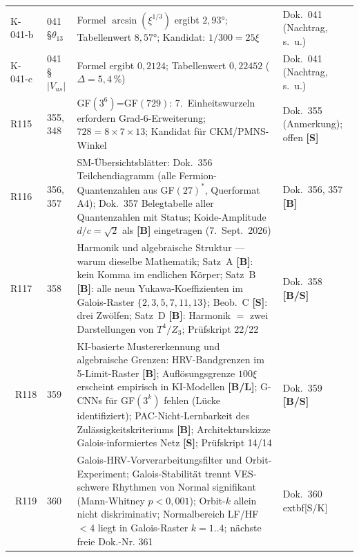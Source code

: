 \begin{longtable}{@{}p{1.2cm}p{3.4cm}p{5.8cm}p{3.4cm}@{}}
K-041-b & 041 \S$\theta_{13}$ & Formel $\arcsin(\xi^{1/3})$ ergibt $2{,}93°$; Tabellenwert $8{,}57°$; Kandidat: $1/300=25\xi$ & Dok.~041 (Nachtrag, s.~u.) \\
K-041-c & 041 \S$|V_{us}|$ & Formel ergibt $0{,}2124$; Tabellenwert $0{,}22452$ ($\Delta=5{,}4\,\%$) & Dok.~041 (Nachtrag, s.~u.) \\
R115 & 355, 348 & GF$(3^6)$=GF$(729)$: 7.\ Einheitswurzeln erfordern Grad-6-Erweiterung; $728=8\times7\times13$; Kandidat für CKM/PMNS-Winkel & Dok.~355 (Anmerkung); offen \textbf{[S]} \\
R116 & 356, 357 & SM-Übersichtsblätter: Dok.~356 Teilchendiagramm (alle Fermion-Quantenzahlen aus GF$(27)^*$, Querformat A4); Dok.~357 Belegtabelle aller Quantenzahlen mit Status; Koide-Amplitude $d/c=\sqrt{2}$ als \textbf{[B]} eingetragen (7.~Sept.~2026) & Dok.~356, 357 \textbf{[B]} \\
R117 & 358 & Harmonik und algebraische Struktur --- warum dieselbe Mathematik; Satz~A \textbf{[B]}: kein Komma im endlichen Körper; Satz~B \textbf{[B]}: alle neun Yukawa-Koeffizienten im Galois-Raster $\{2,3,5,7,11,13\}$; Beob.~C \textbf{[S]}: drei Zwölfen; Satz~D \textbf{[B]}: Harmonik $=$ zwei Darstellungen von $T^4/Z_3$; Prüfskript 22/22 & Dok.~358 \textbf{[B/S]} \\\
R118 & 359 & KI-basierte Mustererkennung und algebraische Grenzen: HRV-Bandgrenzen im 5-Limit-Raster \textbf{[B]}; Auflösungsgrenze $100\xi$ erscheint empirisch in KI-Modellen \textbf{[B/L]}; G-CNNs für GF$(3^k)$ fehlen (Lücke identifiziert); PAC-Nicht-Lernbarkeit des Zulässigkeitskriteriums \textbf{[B]}; Architekturskizze Galois-informiertes Netz \textbf{[S]}; Prüfskript 14/14 & Dok.~359 \textbf{[B/S]} \\\
R119 & 360 & Galois-HRV-Vorverarbeitungsfilter und Orbit-Experiment; Galois-Stabilität trennt VES-schwere Rhythmen von Normal signifikant (Mann-Whitney $p<0{,}001$); Orbit-$k$ allein nicht diskriminativ; Normalbereich LF/HF$<4$ liegt in Galois-Raster $k=1..4$; nächste freie Dok.-Nr. 361 & Dok.~360 	extbf{[S/K]} \
\end{longtable}
\endgroup






